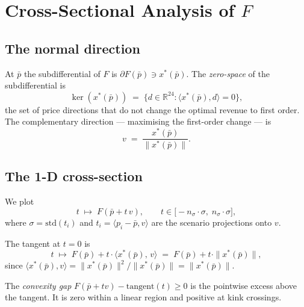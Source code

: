 \documentclass[11pt, a4paper]{article}
\theoremstyle{plain}
\theoremstyle{definition}
\newcommand{\R}{\mathbb{R}}
\newcommand{\pbar}{\bar{p}}
\newcommand{\xstar}{x^*}
\begin{document}
\section{Cross-Sectional Analysis of \texorpdfstring{$F$}{F}}

\subsection{The normal direction}

At $\pbar$ the subdifferential of $F$ is $\partial F(\pbar) \ni \xstar(\pbar)$.
The \emph{zero-space} of the subdifferential is
\begin{equation}
  \ker(\xstar(\pbar))
  \;=\;
  \{d \in \R^{24} : \langle \xstar(\pbar), d \rangle = 0\},
\end{equation}
the set of price directions that do not change the optimal revenue to
first order.  The complementary direction — maximising the first-order
change — is
\begin{equation}
  v \;=\; \frac{\xstar(\pbar)}{\|\xstar(\pbar)\|}.
  \label{eq:vdir}
\end{equation}

\subsection{The 1-D cross-section}

We plot
\begin{equation}
  t \;\longmapsto\; F(\pbar + t\,v),
  \qquad
  t \in \bigl[-n_\sigma \cdot \sigma,\; n_\sigma \cdot \sigma\bigr],
\end{equation}
where $\sigma = \mathrm{std}(t_i)$ and $t_i = \langle p_i - \pbar, v\rangle$
are the scenario projections onto $v$.

The tangent at $t = 0$ is
\begin{equation}
  t \;\longmapsto\;
  F(\pbar) + t \cdot \langle \xstar(\pbar),\, v \rangle
  \;=\;
  F(\pbar) + t \cdot \|\xstar(\pbar)\|,
\end{equation}
since $\langle \xstar(\pbar), v \rangle = \|\xstar(\pbar)\|^2 / \|\xstar(\pbar)\| = \|\xstar(\pbar)\|$.

The \emph{convexity gap} $F(\pbar + tv) - \text{tangent}(t) \geq 0$
is the pointwise excess above the tangent.  It is zero within a linear
region and positive at kink crossings.
\end{document}
